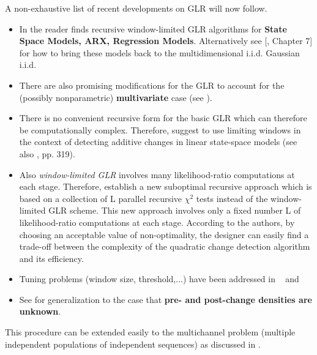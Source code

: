 \documentclass[conference,letterpaper]{IEEEtran}
\begin{document}
A non-exhaustive list of recent developments on GLR will now follow.
\begin{itemize} 
\item In \cite{LAI1995} the reader finds recursive window-limited GLR algorithms for {\bf State Space Models, ARX, Regression Models}. Alternatively see 
[\cite{BANI}, Chapter 7] for how to bring these models back to the multidimensional i.i.d. Gaussian i.i.d.
\item There are also promising modifications for the GLR to account for the (possibly nonparametric) {\bf multivariate} case (see \cite{BANI}).
\item There is no convenient recursive form for the basic GLR which can therefore be computationally complex. Therefore, \cite{WIJO} suggest to use limiting 
windows in the context of detecting additive changes in linear state-space models (see also \cite{LAI2001}, pp. 319). 
\item Also \emph{window-limited GLR} involves many likelihood-ratio computations at each stage. Therefore, \cite{NIKO} establish a new suboptimal recursive 
approach which is based on a collection of L parallel recursive $\chi^2$ tests instead of the window-limited GLR scheme. This new approach involves only a 
fixed number L of likelihood-ratio computations at each stage. According to the authors, by choosing an acceptable value of non-optimality, the designer can 
easily find a trade-off between the complexity of the quadratic change detection algorithm and its efficiency.
\item Tuning problems (window size, threshold,...) have been addressed in ~\cite{LAI1995} and~\cite{LAISHAN1999}
\item See \cite{LAI2009} for generalization to the case that {\bf pre- and post-change densities are unknown}. 
\end{itemize}

This procedure can be extended easily to the multichannel problem (multiple independent populations of independent sequences) as discussed in \cite{TART08}.
\end{document}
